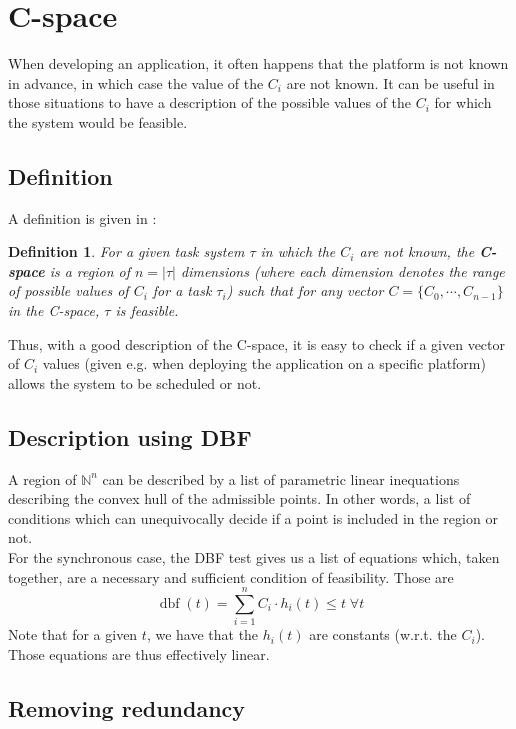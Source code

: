 \documentclass[a4paper,10pt]{article}
\newcommand{\dbf}[1]{\operatorname{dbf}(#1)}
\newtheorem{definition}{Definition}
\begin{document}
\section{C-space}
When developing an application, it often happens that the platform is not known
in advance, in which case the value of the $C_i$ are not known. It can be
useful in those situations to have a description of the possible values of
the $C_i$ for which the system would be feasible.

\subsection{Definition}

A definition is given in \cite{george2009characterization} :

\begin{definition}
	For a given task system $\tau$ in which the $C_i$ are not known, the
\textbf{C-space} is a region of $n = |\tau|$ dimensions (where each dimension
denotes the range of possible values of $C_i$ for a task $\tau_i$) such that
for any vector $C = \{ C_0, \cdots, C_{n-1}\}$ in the C-space, $\tau$ is
feasible.
\end{definition}

Thus, with a good description of the C-space, it is easy to check if a given
vector of $C_i$ values (given e.g. when deploying the application on a specific platform) allows the system to be scheduled or not.

\subsection{Description using DBF}

A region of $\mathbb{N}^n$ can be described by a list of parametric linear
inequations describing the convex hull of the admissible points. In
other words, a list of conditions which can unequivocally decide if a point is included in the region or not.\\

For the synchronous case, the DBF test gives us a list of equations which, taken together, are a necessary and sufficient condition of feasibility. Those are
\[
	\dbf{t} = \sum_{i=1}^{n} C_i \cdot h_i(t) \leq t \; \forall t
\]
Note that for a given $t$, we have that the $h_i(t)$ are constants (w.r.t. the
$C_i$). Those equations are thus effectively linear.\\

\subsection{Removing redundancy}
\end{document}
